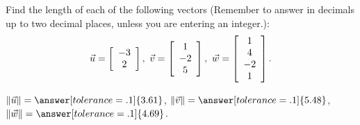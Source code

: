 \documentclass{ximera}
\author{Zack Reed}
\begin{document}
\begin{exercise}
  Find the length of each of the following vectors (Remember to answer in decimals up to two decimal places, unless you are entering an integer.):
\begin{equation*}
  \vect{u}=\startmat{c}-3\\2\stopmat, \quad
  \vect{v}=\startmat{c}1\\-2\\5\stopmat, \quad
  \vect{w}=\startmat{c}1\\4\\-2\\1\stopmat.
\end{equation*}

$\norm{\vect{u}} = \answer[tolerance=.1]{3.61}$, $\norm{\vect{v}} = \answer[tolerance=.1]{5.48}$,
    $\norm{\vect{w}} = \answer[tolerance=.1]{4.69}$.

\end{exercise}
\end{document}
